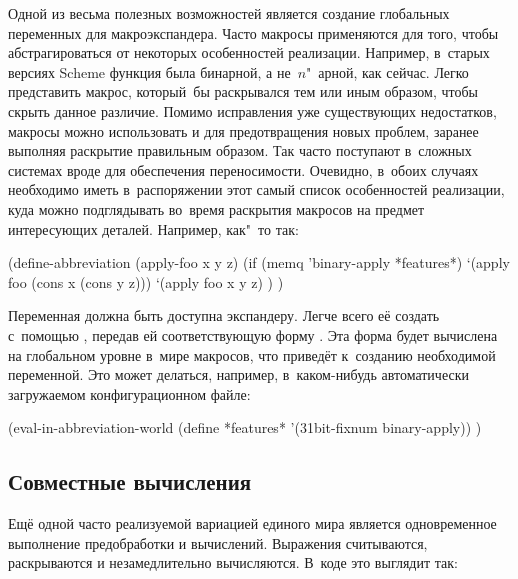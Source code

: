 \bigskip

Одной из весьма полезных возможностей  является
создание глобальных переменных для макроэкспандера. Часто макросы применяются
для того, чтобы абстрагироваться от некоторых особенностей реализации. Например,
в~старых версиях Scheme функция  была бинарной, а не~$n$"~арной, как
сейчас. Легко представить макрос, который~бы раскрывался тем или иным образом,
чтобы скрыть данное различие. Помимо исправления уже существующих недостатков,
макросы можно использовать и для предотвращения новых проблем, заранее выполняя
раскрытие правильным образом. Так часто поступают в~сложных системах вроде
{\Meroon} для обеспечения переносимости. Очевидно, в~обоих случаях необходимо
иметь в~распоряжении этот самый список особенностей реализации, куда можно
подглядывать во~время раскрытия макросов на предмет интересующих деталей.
Например, как"~то так:

\begin{code:lisp}
(define-abbreviation (apply-foo x y z)
  (if (memq 'binary-apply *features*)
      `(apply foo (cons x (cons y z)))
      `(apply foo x y z) ) )
\end{code:lisp}

Переменная  должна быть доступна экспандеру. Легче всего её
создать с~помощью , передав ей соответствующую
форму . Эта форма будет вычислена на глобальном уровне в~мире
макросов, что приведёт к~созданию необходимой переменной. Это может делаться,
например, в~каком-нибудь автоматически загружаемом конфигурационном файле:

\begin{code:lisp}
(eval-in-abbreviation-world
  (define *features* '(31bit-fixnum binary-apply)) )
\end{code:lisp}


\subsection{Совместные вычисления}\label{macros/define/ssect:simult}

Ещё одной часто реализуемой вариацией единого мира является одновременное
выполнение предобработки и вычислений. Выражения считываются, раскрываются и
незамедлительно вычисляются. В~коде это выглядит так:

